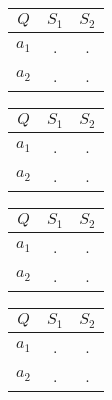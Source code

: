 \begin{enumerate}
\begin{table}[h]
\small       
\begin{tabular}[t]{|c c c|}
\hline
$Q$ & $S_{1}$ & $S_{2}$  \\ \hline
$a_{1}$&.&.\\ \hline
$a_{2}$&.& .\\ \hline
\end{tabular}
\hfill
\begin{tabular}[t]{|c c c|}
\hline
$Q$ & $S_{1}$ & $S_{2}$  \\ \hline
$a_{1}$&.&.\\ \hline
$a_{2}$&.&.\\ \hline
\end{tabular}
\hfill
\begin{tabular}[t]{|c c c|}
 \hline
 $Q$ & $S_{1}$ & $S_{2}$  \\ \hline
 $a_{1}$&.&.\\ \hline
 $a_{2}$&.&. \\ \hline
 \end{tabular}
 \hfill
 \begin{tabular}[t]{|c c c|}
 \hline
 $Q$ & $S_{1}$ & $S_{2}$  \\ \hline
 $a_{1}$&.&.\\ \hline
 $a_{2}$&.&. \\ \hline
\end{tabular}
\end{table}

 

\end{enumerate}